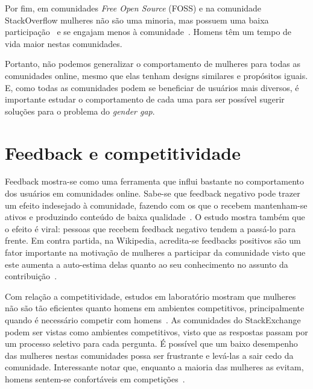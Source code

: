 Por fim, em comunidades \textit{Free Open Source} (FOSS) e na comunidade StackOverflow mulheres não são uma minoria, mas possuem uma baixa participação~\cite{rustad2011suck} e se engajam menos à comunidade~\cite{Vasilescu27092013}. Homens têm um tempo de vida maior nestas comunidades.

Portanto, não podemos generalizar o comportamento de mulheres para todas as comunidades online, mesmo que elas tenham designs similares e propósitos iguais. E, como todas as comunidades podem se beneficiar de usuários mais diversos, é importante estudar o comportamento de cada uma para ser possível sugerir soluções para o problema do \textit{gender gap}.


\section{Feedback e competitividade}

Feedback mostra-se como uma ferramenta que influi bastante no comportamento dos usuários em comunidades online. Sabe-se que feedback negativo pode trazer um efeito indesejado à comunidade, fazendo com os que o recebem mantenham-se ativos e produzindo conteúdo de baixa qualidade~\cite{cheng2014community}. O estudo mostra também que o efeito é viral: pessoas que recebem feedback negativo tendem a passá-lo para frente. Em contra partida, na Wikipedia, acredita-se feedbacks positivos são um fator importante na motivação de mulheres a participar da comunidade visto que este aumenta a auto-estima delas quanto ao seu conhecimento no assunto da contribuição~\cite{collier2012conflict}.

Com relação a competitividade, estudos em laboratório mostram que mulheres não são tão eficientes quanto homens em ambientes competitivos, principalmente quando é necessário competir com homens~\cite{gneezy2003performance}. As comunidades do StackExchange podem ser vistas como ambientes competitivos, visto que as respostas passam por um processo seletivo para cada pergunta. É possível que um baixo desempenho das mulheres nestas comunidades possa ser frustrante e levá-las a sair cedo da comunidade. Interessante notar que, enquanto a maioria das mulheres as evitam, homens sentem-se confortáveis em competições~\cite{niederle2005women,croson2009gender}.

